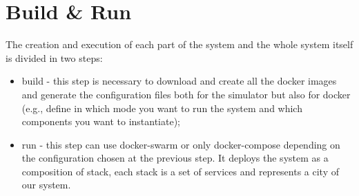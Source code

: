 \section{Build \& Run}
The creation and execution of each part of the system and
the whole system itself is divided in two steps:

\begin{itemize}
   \item build - this step is necessary to download and create all the docker
   images and generate the configuration files both for the simulator but
   also for docker (e.g., define in which mode you want to run the system and
   which components you want to instantiate);
   \item run - this step can use docker-swarm or only docker-compose depending
   on the configuration chosen at the previous step. It deploys the system
   as a composition of stack, each stack is a set of services and represents
   a city of our system.
\end{itemize}
